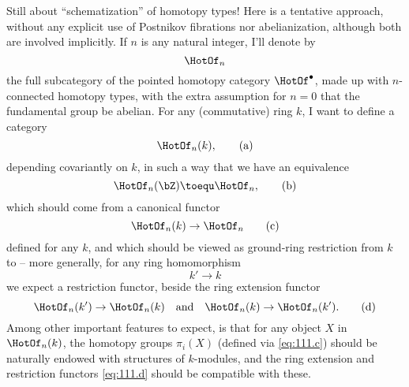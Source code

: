 \bigbreak

\presectionfill{}\par

\label{sec:111}%
Still about ``schematization'' of homotopy types! Here is a tentative
approach, without any explicit use of Postnikov fibrations nor
abelianization, although both are involved implicitly. If $n$ is any
natural integer, I'll denote by
\[\HotOf_n\]
the full subcategory of the pointed homotopy category
$\HotOf^\bullet$, made up with $n$-connected homotopy types, with the
extra assumption for $n=0$ that the fundamental group be abelian. For
any (commutative) ring $k$, I want to define a category
\begin{equation}
  \label{eq:111.a}
  \HotOf_n(k),\tag{a}
\end{equation}
depending covariantly on $k$, in such a way that we have an
equivalence
\begin{equation}
  \label{eq:111.b}
  \HotOf_n(\bZ)\toequ\HotOf_n,\tag{b}
\end{equation}
which should come from a canonical functor
\begin{equation}
  \label{eq:111.c}
  \HotOf_n(k) \to \HotOf_n\tag{c}
\end{equation}
defined for any $k$, and which should be viewed as ground-ring
restriction from $k$ to \bZ{} -- more generally, for any ring
homomorphism
\[k'\to k\]
we expect a restriction functor, beside the ring extension functor
\begin{equation}
  \label{eq:111.d}
  \HotOf_n(k')\to\HotOf_n(k)\quad\text{and}\quad
  \HotOf_n(k)\to\HotOf_n(k').\tag{d}
\end{equation}
Among other important features to expect, is that for any object $X$
in $\HotOf_n(k)$, the homotopy groups $\pi_i(X)$ (defined via
\eqref{eq:111.c}) should be naturally endowed with structures of
$k$-modules, and the ring extension and restriction functors
\eqref{eq:111.d} should be compatible with these.


